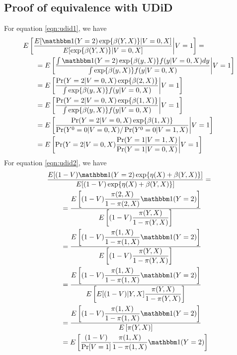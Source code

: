 \begin{appendix}
\begin{refsection}
\subsection{Proof of equivalence with UDiD}
 For equation \ref{eqn:udid1}, we have
\begin{align*}
     E&\left[\dfrac{E[\mathbbm 1(Y=2)\exp\{\beta(Y,X)\} | V = 0, X]}{E[\exp\{\beta(Y,X)\} | V = 0, X]}\bigg|V = 1\right] = \\
     &\quad = E \left[\dfrac{\int \mathbbm 1(Y=2)\exp\{\beta(y,X)\} f(y| V = 0, X)dy}{\int \exp\{\beta(y,X)\} f(y| V = 0, X)}\bigg|V = 1\right] \\
     &\quad = E \left[\dfrac{\Pr(Y = 2 | V = 0, X)\exp\{\beta(2,X)\} }{\int \exp\{\beta(y,X)\} f(y| V = 0, X)}\bigg|V = 1\right] \\
     &\quad = E \left[\dfrac{\Pr(Y = 2 | V = 0, X)\exp\{\beta(1,X)\} }{\int \exp\{\beta(y,X)\} f(y| V = 0, X)}\bigg|V = 1\right] \\
     &\quad = E \left[\dfrac{\Pr(Y = 2 | V = 0, X)\exp\{\beta(1,X)\} }{\Pr(Y^0 = 0| V = 0, X)/\Pr(Y^0 =0|V = 1, X)}\bigg|V = 1\right] \\
     &\quad = E \left[\Pr(Y = 2|V = 0, X)\dfrac{\Pr(Y = 1 | V = 1, X)}{\Pr(Y = 1 | V = 0, X)}\bigg|V = 1\right]
\end{align*}
For equation \ref{eqn:udid2}, we have
\begin{align*}
     &\dfrac{E[(1-V)\mathbbm 1(Y=2)\exp\{\eta(X) + \beta(Y,X)\}]}{E[(1-V)\exp\{\eta(X) +\beta(Y,X)\}]} = \\
     &\qquad = \dfrac{E\left[(1-V)\dfrac{\pi(2,X)}{1-\pi(2,X)}\mathbbm 1(Y=2)\right]}{E\left[(1-V)\dfrac{\pi(Y, X)}{1-\pi(Y,X)}\right]} \\
     &\qquad = \dfrac{E\left[(1-V)\dfrac{\pi(1,X)}{1-\pi(1,X)}\mathbbm 1(Y=2)\right]}{E\left[(1-V)\dfrac{\pi(Y, X)}{1-\pi(Y,X)}\right]} \\
     &\qquad = \dfrac{E\left[(1-V)\dfrac{\pi(1,X)}{1-\pi(1,X)}\mathbbm 1(Y=2)\right]}{E\left[E[(1-V) | Y, X]\dfrac{\pi(Y, X)}{1-\pi(Y,X)}\right]} \\
     &\qquad = \dfrac{E\left[(1-V)\dfrac{\pi(1,X)}{1-\pi(1,X)}\mathbbm 1(Y=2)\right]}{E\left[\pi(Y,X)\right]} \\
     &\qquad = E\left[\dfrac{(1-V)}{\Pr[V=1]}\dfrac{\pi(1,X)}{1-\pi(1,X)}\mathbbm 1(Y=2)\right]
\end{align*}

\end{refsection}
\end{appendix}
